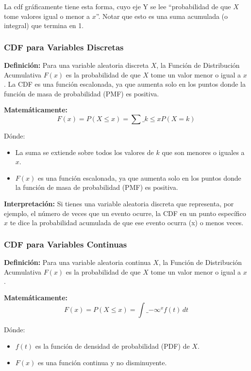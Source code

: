 \documentclass[
  letterpaper,
  DIV=11,
  numbers=noendperiod]{scrartcl}
\providecommand{\tightlist}{%
  \setlength{\itemsep}{0pt}\setlength{\parskip}{0pt}}\usepackage{longtable,booktabs,array}
\begin{document}
La cdf gráficamente tiene esta forma, cuyo eje Y se lee ``probabilidad
de que \(X\) tome valores igual o menor a \(x\)''. Notar que esto es una
suma acumulada (o integral) que termina en 1.

\hypertarget{cdf-para-variables-discretas}{%
\subsubsection{CDF para Variables
Discretas}\label{cdf-para-variables-discretas}}

\textbf{Definición:} Para una variable aleatoria discreta \(X\), la
Función de Distribución Acumulativa \(F(x)\) es la probabilidad de que
\(X\) tome un valor menor o igual a \(x\). La CDF es una función
escalonada, ya que aumenta solo en los puntos donde la función de masa
de probabilidad (PMF) es positiva.

\textbf{Matemáticamente:}
\[ F(x) = P(X \leq x) = \sum\_{k \leq x} P(X = k) \]

Dónde:

\begin{itemize}
\tightlist
\item
  La suma se extiende sobre todos los valores de \(k\) que son menores o
  iguales a \(x\).
\item
  \(F(x)\) es una función escalonada, ya que aumenta solo en los puntos
  donde la función de masa de probabilidad (PMF) es positiva.
\end{itemize}

\textbf{Interpretación:} Si tienes una variable aleatoria discreta que
representa, por ejemplo, el número de veces que un evento ocurre, la CDF
en un punto específico \(x\) te dice la probabilidad acumulada de que
ese evento ocurra (x) o menos veces.

\hypertarget{cdf-para-variables-continuas}{%
\subsubsection{CDF para Variables
Continuas}\label{cdf-para-variables-continuas}}

\textbf{Definición:} Para una variable aleatoria continua \(X\), la
Función de Distribución Acumulativa \(F(x)\) es la probabilidad de que
\(X\) tome un valor menor o igual a \(x\).

\textbf{Matemáticamente:}
\[ F(x) = P(X \leq x) = \int\_{-\infty}^{x} f(t) \, dt \]

Dónde:

\begin{itemize}
\tightlist
\item
  \(f(t)\) es la función de densidad de probabilidad (PDF) de \(X\).
\item
  \(F(x)\) es una función continua y no disminuyente.
\end{itemize}
\end{document}
